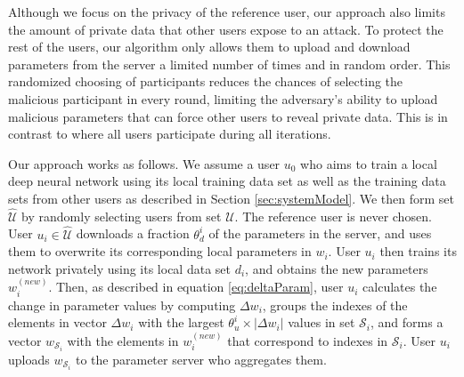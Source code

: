 \documentclass[letterpaper]{article}
\begin{document}
\begin{flushleft}
{Although we focus on the privacy of the reference user, our approach also
limits the amount of private data that other users expose to an attack. To protect the rest of the users, our algorithm only allows
them to upload and download parameters from the server a limited number of times and in random order. 
This randomized choosing of participants reduces the chances of selecting the malicious participant in every round, limiting
the adversary's ability to upload malicious parameters that can force other users to reveal private data. 
This is in contrast to \cite{shokri2015privacy} where all users participate during all iterations. 


Our approach works as follows. 
We assume a user $u_0$ who aims to train a local deep neural network using its local training data set as well as the training
data sets from other users as described in Section \ref{sec:systemModel}.  We then form set $\hat{\mathcal{{U}}}$ by randomly selecting
users from set $\mathcal{U}$. The reference user is never chosen.  
User $u_i\in\hat{\mathcal{U}}$ downloads a fraction $\theta_d^i$ of the parameters
in the server, and uses them to overwrite its  corresponding local parameters in $w_i$.
User $u_i$ then trains its network privately using its local data set  $d_i$, and obtains the new parameters $w_i^{(new)}$.
Then, as described in equation \eqref{eq:deltaParam}, user $u_i$ calculates the change in parameter values by computing $\Delta w_i$, groups the
indexes of the elements in vector $\Delta w_i$ with the largest $\theta_u^i\times |\Delta w_i|$ values in set $\mathcal{S}_i$, and 
forms a vector $w_{\mathcal{S}_i}$ with the elements in $w_i^{(new)}$ that correspond to indexes in $\mathcal{S}_i$. 
User $u_i$ uploads $w_{\mathcal{S}_i}$ to the parameter server who aggregates them. 

}
\end{flushleft}
\end{document}
